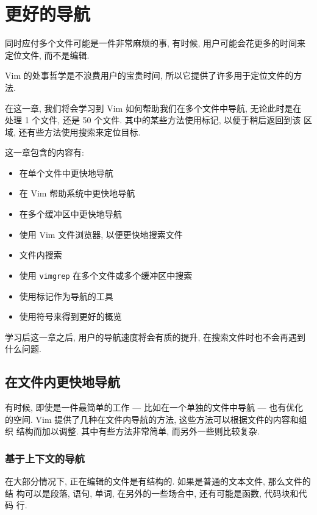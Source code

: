 \chapter{更好的导航}
\label{chap:better_navigation}
同时应付多个文件可能是一件非常麻烦的事, 有时候, 用户可能会花更多的时间来
定位文件, 而不是编辑.

Vim 的处事哲学是不浪费用户的宝贵时间, 所以它提供了许多用于定位文件的方法.

在这一章, 我们将会学习到 Vim 如何帮助我们在多个文件中导航, 无论此时是在
处理 1 个文件, 还是 50 个文件. 其中的某些方法使用标记, 以便于稍后返回到该
区域, 还有些方法使用搜索来定位目标.

这一章包含的内容有:
\begin{itemize}
    \item 在单个文件中更快地导航
    \item 在 Vim 帮助系统中更快地导航
    \item 在多个缓冲区中更快地导航
    \item 使用 Vim 文件浏览器, 以便更快地搜索文件
    \item 文件内搜索
    \item 使用 \texttt{vimgrep} 在多个文件或多个缓冲区中搜索
    \item 使用标记作为导航的工具
    \item 使用符号来得到更好的概览
\end{itemize}

学习后这一章之后, 用户的导航速度将会有质的提升, 在搜索文件时也不会再遇到
什么问题.
\section{在文件内更快地导航}
\label{sec:faster_navigation_in_a_file}

有时候, 即使是一件最简单的工作 --- 比如在一个单独的文件中导航 --- 也有优化
的空间. Vim 提供了几种在文件内导航的方法, 这些方法可以根据文件的内容和组织
结构而加以调整. 其中有些方法非常简单, 而另外一些则比较复杂.

\subsection{基于上下文的导航}
\label{subsec:context_aware_navigation}

在大部分情况下, 正在编辑的文件是有结构的. 如果是普通的文本文件, 那么文件的结
构可以是段落, 语句, 单词, 在另外的一些场合中, 还有可能是函数, 代码块和代码
行.

